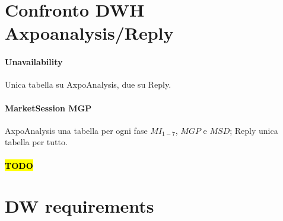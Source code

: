 
        
        
    
        





\section{Confronto DWH Axpoanalysis/Reply}
    \paragraph{Unavailability} Unica tabella su AxpoAnalysis, due su Reply.
    \paragraph{MarketSession MGP} AxpoAnalysis una tabella per ogni fase $MI_{1-7}$, $MGP$ e $MSD$; Reply unica tabella per tutto.
    
    \paragraph{\hl{TODO}}

\section{DW requirements}
